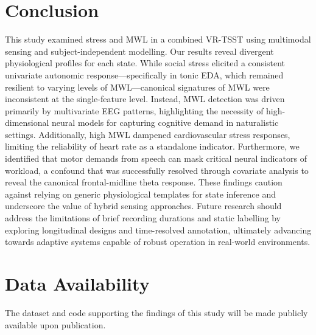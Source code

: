 \documentclass[lettersize,journal]{IEEEtran}
\begin{document}
\section{Conclusion}
This study examined stress and MWL in a combined VR-TSST using multimodal sensing and subject-independent modelling. Our results reveal divergent physiological profiles for each state. While social stress elicited a consistent univariate autonomic response—specifically in tonic EDA, which remained resilient to varying levels of MWL—canonical signatures of MWL were inconsistent at the single-feature level. Instead, MWL detection was driven primarily by multivariate EEG patterns, highlighting the necessity of high-dimensional neural models for capturing cognitive demand in naturalistic settings. Additionally, high MWL dampened cardiovascular stress responses, limiting the reliability of heart rate as a standalone indicator. Furthermore, we identified that motor demands from speech can mask critical neural indicators of workload, a confound that was successfully resolved through covariate analysis to reveal the canonical frontal-midline theta response. These findings caution against relying on generic physiological templates for state inference and underscore the value of hybrid sensing approaches. Future research should address the limitations of brief recording durations and static labelling by exploring longitudinal designs and time-resolved annotation, ultimately advancing towards adaptive systems capable of robust operation in real-world environments.

\section*{Data Availability}
The dataset and code supporting the findings of this study will be made publicly available upon publication.






\newpage






\vfill
\end{document}
